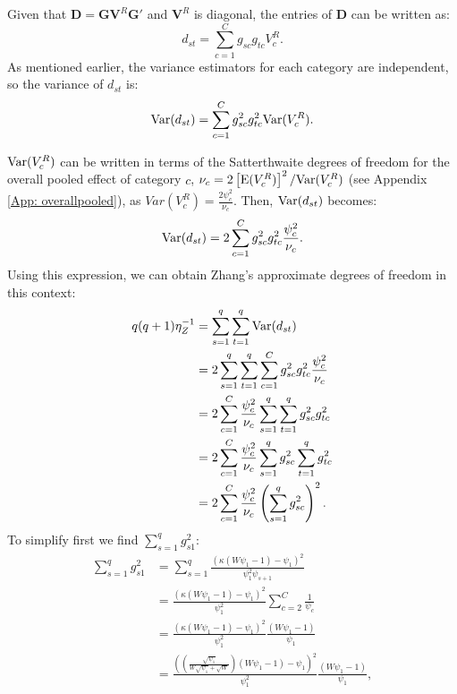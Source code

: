 Given that $\bm{D} = \bm{G} \bm{V}^R \bm{G}'$ and $\bm{V}^R$ is diagonal, the entries of $\bm{D}$ can be written as:
\begin{equation}
    d_{st} = \sum_{c=1}^C g_{sc} g_{tc} V^R_c.
    \nonumber
\end{equation}
As mentioned earlier, the variance estimators for each category are independent, so the variance of $d_{st}$ is:
\begin{equation}
    {\text{Var}}(d_{st}) = \sum_{c=1}^C g_{sc}^2 g_{tc}^2 {\text{Var}}(V^R_c).
    \nonumber
\end{equation}

${\text{Var}}(V^R_c)$ can be written in terms of the Satterthwaite degrees of freedom for the overall pooled effect of category $c$, $\nu_c = 2\left[{\text{E}}(V^R_c)\right]^2 / {\text{Var}}(V^R_c)$ (see Appendix \ref{App: overallpooled}), as $Var(V_c^R) = \frac{2\psi_c^2}{\nu_c}$. Then, ${\text{Var}}(d_{st})$ becomes: 
\begin{equation}
    {\text{Var}}(d_{st}) = 2 \sum_{c=1}^C g_{sc}^2 g_{tc}^2 \frac{\psi_c^2}{\nu_c}.
    \nonumber
\end{equation}
Using this expression, we can obtain Zhang's approximate degrees of freedom in this context:
\begin{equation}
    \begin{aligned}
q(q + 1)\eta_Z^{-1} &= \sum_{s=1}^q \sum_{t = 1}^q {\text{Var}}(d_{st}) \\ 
&= 2\sum_{s=1}^q \sum_{t = 1}^q \sum_{c=1}^C g_{sc}^2 g_{tc}^2 \frac{\psi_c^2}{\nu_c} \\
&= 2 \sum_{c=1}^C \frac{\psi_c^2}{\nu_c} \sum_{s=1}^q \sum_{t=1}^q g_{sc}^2 g_{tc}^2 \\
&= 2 \sum_{c=1}^C \frac{\psi_c^2}{\nu_c} \sum_{s=1}^q g_{sc}^2 \sum_{t=1}^q g_{tc}^2 \\
&= 2\sum_{c=1}^C \frac{\psi_c^2}{\nu_c} \left(\sum_{s=1}^q g_{sc}^2\right)^2.
\end{aligned}
\nonumber
\end{equation}
To simplify first we find $\sum_{s=1}^q g_{s1}^2$:
\begin{equation}
    \begin{aligned}
\sum_{s=1}^q g_{s1}^2 &= \sum_{s=1}^q \frac{\left(\kappa(W \psi_1 - 1) - \psi_1\right)^2}{\psi_1^2 \psi_{s+1}} \\
&= \frac{\left(\kappa(W \psi_1 - 1) - \psi_1\right)^2}{\psi_1^2} \sum_{c=2}^C \frac{1}{\psi_{c}} \\
&= \frac{\left(\kappa(W \psi_1 - 1) - \psi_1\right)^2}{\psi_1^2} \frac{(W \psi_1 - 1)}{\psi_1} \\
&= \frac{\left(\left( \frac{\sqrt{\psi_1}}{W \sqrt{\psi_1} + \sqrt{W}}\right)(W \psi_1 - 1) - \psi_1\right)^2}{\psi_1^2} \frac{(W \psi_1 - 1)}{\psi_1}, \\
\end{aligned}
\nonumber
\end{equation}


